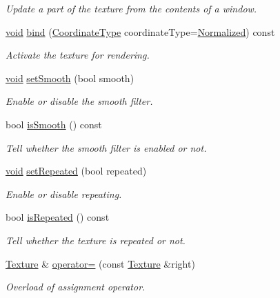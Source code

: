 \begin{DoxyCompactItemize}
\begin{DoxyCompactList}\small\item\em Update a part of the texture from the contents of a window. \end{DoxyCompactList}\item 
\hyperlink{glutf90_8h_ac778d6f63f1aaf8ebda0ce6ac821b56e}{void} \hyperlink{classsf_1_1_texture_ae4063cbdf35eb24645bf5f267ac5b78d}{bind} (\hyperlink{classsf_1_1_texture_aa6fd3bbe3c334b3c4428edfb2765a82e}{Coordinate\-Type} coordinate\-Type=\hyperlink{classsf_1_1_texture_aa6fd3bbe3c334b3c4428edfb2765a82ea69d6228950882e4d68be4ba4dbe7df73}{Normalized}) const 
\begin{DoxyCompactList}\small\item\em Activate the texture for rendering. \end{DoxyCompactList}\item 
\hyperlink{glutf90_8h_ac778d6f63f1aaf8ebda0ce6ac821b56e}{void} \hyperlink{classsf_1_1_texture_a0c3bd6825b9a99714f10d44179d74324}{set\-Smooth} (bool smooth)
\begin{DoxyCompactList}\small\item\em Enable or disable the smooth filter. \end{DoxyCompactList}\item 
bool \hyperlink{classsf_1_1_texture_a1d6643d3c76f2be29dc401dc22749e16}{is\-Smooth} () const 
\begin{DoxyCompactList}\small\item\em Tell whether the smooth filter is enabled or not. \end{DoxyCompactList}\item 
\hyperlink{glutf90_8h_ac778d6f63f1aaf8ebda0ce6ac821b56e}{void} \hyperlink{classsf_1_1_texture_aaa87d1eff053b9d4d34a24c784a28658}{set\-Repeated} (bool repeated)
\begin{DoxyCompactList}\small\item\em Enable or disable repeating. \end{DoxyCompactList}\item 
bool \hyperlink{classsf_1_1_texture_a007a19b48952b7854120bf423c102150}{is\-Repeated} () const 
\begin{DoxyCompactList}\small\item\em Tell whether the texture is repeated or not. \end{DoxyCompactList}\item 
\hyperlink{classsf_1_1_texture}{Texture} \& \hyperlink{classsf_1_1_texture_a80a089b6b19bb09b83012d5f0e6af9ba}{operator=} (const \hyperlink{classsf_1_1_texture}{Texture} \&right)
\begin{DoxyCompactList}\small\item\em Overload of assignment operator. \end{DoxyCompactList}\end{DoxyCompactItemize}
